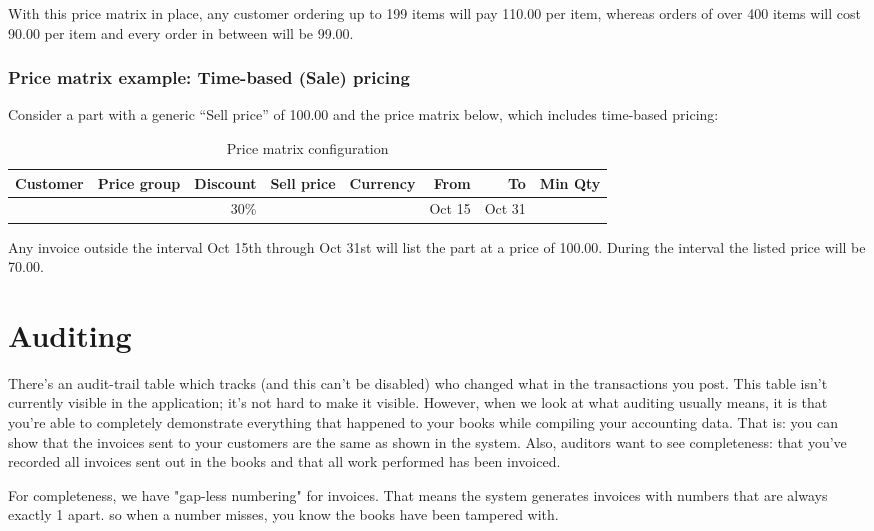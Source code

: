 With this price matrix in place, any customer ordering up to 199 items will pay 110.00 per item, whereas orders of over
400 items will cost 90.00 per item and every order in between will be 99.00.

\subsection{Price matrix example: Time-based (Sale) pricing}

Consider a part with a generic ``Sell price'' of 100.00 and the price matrix below, which includes time-based pricing:

\begin{table}[H]
	\caption{Price matrix configuration}
	\begin{tabular}{|ccrrcrrr|}
		\hline
		\bf Customer & \bf Price group & \bf Discount &  \bf Sell price & \bf Currency & \bf From & \bf To & \bf Min Qty \\
		\hline
		& & 30\% & & & Oct 15 & Oct 31 & \\
		\hline
	\end{tabular}
\end{table}

Any invoice outside the interval Oct 15th through Oct 31st will list
the part at a price of 100.00.  During the interval the listed price
will be 70.00.

\chapter{Auditing}
\label{cha-auditing}

There's an audit-trail table which tracks (and this can't be disabled) who changed what in the transactions you post. This table isn't currently visible in the application; it's not hard to make it visible. However, when we look at what auditing usually means, it is that you're able to completely demonstrate everything that happened to your books while compiling your accounting data. That is: you can show that the invoices sent to your customers are the same as shown in the system. Also, auditors want to see completeness: that you've recorded all invoices sent out in the books and that all work performed has been invoiced.

For completeness, we have "gap-less numbering" for invoices.
That means the system generates invoices with numbers that are always exactly 1 apart.
so when a number misses, you know the books have been tampered with.

